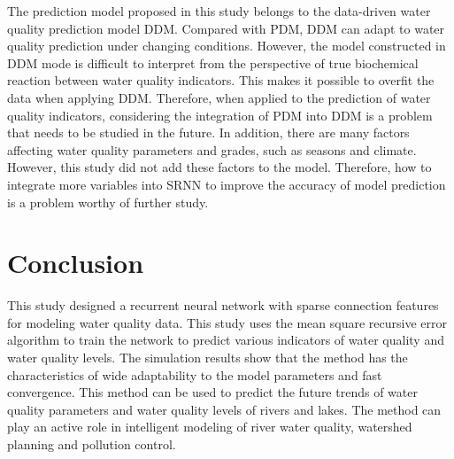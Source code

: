 \documentclass[runningheads]{llncs}
\begin{document}
The prediction model proposed in this study belongs to the 
data-driven water quality prediction model DDM. Compared with
PDM, DDM can adapt to water quality prediction under changing 
conditions. However, the model constructed in DDM mode is 
difficult to interpret from the perspective of true biochemical 
reaction between water quality indicators. This makes it possible
to overfit the data when applying DDM. Therefore, when applied to 
the prediction of water quality indicators, considering the integration 
of PDM into DDM is a problem that needs to be studied in the future.
In addition, there are many factors affecting water quality parameters 
and grades, such as seasons and climate. However, this study did not add 
these factors to the model. Therefore, how to integrate more variables 
into SRNN to improve the accuracy of model prediction is a problem 
worthy of further study.  

\section{Conclusion}
This study designed a recurrent neural network with sparse
connection features for modeling water quality data. 
This study uses the mean square recursive error algorithm 
to train the network to predict various indicators of water 
quality and water quality levels. The simulation results 
show that the method has the characteristics of wide 
adaptability to the model parameters and fast convergence.
This method can be used to predict the future trends of
water quality parameters and water quality levels of 
rivers and lakes. The method can play an active role 
in intelligent modeling of river water quality, 
watershed planning and pollution control.
%
%
%
 
 
\end{document}
